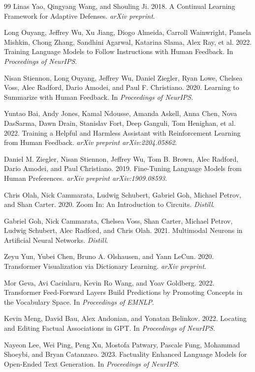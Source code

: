 \documentclass[sigconf]{acmart}
\begin{document}
\begin{thebibliography}{99}
Linas Yao, Qingyang Wang, and Shouling Ji. 2018. A Continual Learning Framework for Adaptive Defenses. \textit{arXiv preprint}.

Long Ouyang, Jeffrey Wu, Xu Jiang, Diogo Almeida, Carroll Wainwright, Pamela Mishkin, Chong Zhang, Sandhini Agarwal, Katarina Slama, Alex Ray, et al. 2022. Training Language Models to Follow Instructions with Human Feedback. In \textit{Proceedings of NeurIPS}.

Nisan Stiennon, Long Ouyang, Jeffrey Wu, Daniel Ziegler, Ryan Lowe, Chelsea Voss, Alec Radford, Dario Amodei, and Paul F. Christiano. 2020. Learning to Summarize with Human Feedback. In \textit{Proceedings of NeurIPS}.

Yuntao Bai, Andy Jones, Kamal Ndousse, Amanda Askell, Anna Chen, Nova DasSarma, Dawn Drain, Stanislav Fort, Deep Ganguli, Tom Henighan, et al. 2022. Training a Helpful and Harmless Assistant with Reinforcement Learning from Human Feedback. \textit{arXiv preprint arXiv:2204.05862}.

Daniel M. Ziegler, Nisan Stiennon, Jeffrey Wu, Tom B. Brown, Alec Radford, Dario Amodei, and Paul Christiano. 2019. Fine-Tuning Language Models from Human Preferences. \textit{arXiv preprint arXiv:1909.08593}.

Chris Olah, Nick Cammarata, Ludwig Schubert, Gabriel Goh, Michael Petrov, and Shan Carter. 2020. Zoom In: An Introduction to Circuits. \textit{Distill}.

Gabriel Goh, Nick Cammarata, Chelsea Voss, Shan Carter, Michael Petrov, Ludwig Schubert, Alec Radford, and Chris Olah. 2021. Multimodal Neurons in Artificial Neural Networks. \textit{Distill}.

Zeyu Yun, Yubei Chen, Bruno A. Olshausen, and Yann LeCun. 2020. Transformer Visualization via Dictionary Learning. \textit{arXiv preprint}.

Mor Geva, Avi Caciularu, Kevin Ro Wang, and Yoav Goldberg. 2022. Transformer Feed-Forward Layers Build Predictions by Promoting Concepts in the Vocabulary Space. In \textit{Proceedings of EMNLP}.

Kevin Meng, David Bau, Alex Andonian, and Yonatan Belinkov. 2022. Locating and Editing Factual Associations in GPT. In \textit{Proceedings of NeurIPS}.

Nayeon Lee, Wei Ping, Peng Xu, Mostofa Patwary, Pascale Fung, Mohammad Shoeybi, and Bryan Catanzaro. 2023. Factuality Enhanced Language Models for Open-Ended Text Generation. In \textit{Proceedings of NeurIPS}.


\end{thebibliography}
\end{document}
